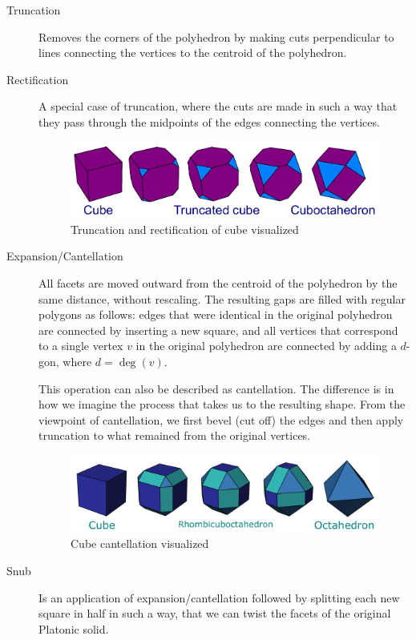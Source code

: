 \begin{description}
    \item[Truncation] Removes the corners of the polyhedron by making cuts perpendicular to lines connecting the vertices to the centroid of the polyhedron.
    \item[Rectification] A special case of truncation, where the cuts are made in such a way that they pass through the midpoints of the edges connecting the vertices.
    \begin{figure}[H]
        \centering
        \includegraphics[width=1\textwidth]{../Resources/Figs/op_truncation.pdf}
        \caption{Truncation and rectification of cube visualized \cite{wikimedia-cube-truncation}}
        \label{fig:op_truncation}
    \end{figure}
    \item[Expansion/Cantellation] All facets are moved outward from the centroid of the polyhedron by the same distance, without rescaling. The resulting gaps are filled with regular polygons as follows: edges that were identical in the original polyhedron are connected by inserting a new square, and all vertices that correspond to a single vertex $v$ in the original polyhedron are connected by adding a $d$-gon, where $d = \deg(v)$.

    This operation can also be described as cantellation. The difference is in how we imagine the process that takes us to the resulting shape. From the viewpoint of cantellation, we first bevel (cut off) the edges and then apply truncation to what remained from the original vertices.
    \begin{figure}[H]
        \centering
        \includegraphics[width=1\textwidth]{../Resources/Figs/op_cantellation.pdf}
        \caption{Cube cantellation visualized \cite{wikimedia-cube-cantellation}}
        \label{fig:op_cantellation}
    \end{figure}
    \item[Snub] Is an application of expansion/cantellation followed by splitting each new square in half in such a way, that we can twist the facets of the original Platonic solid.
    


\end{description}
